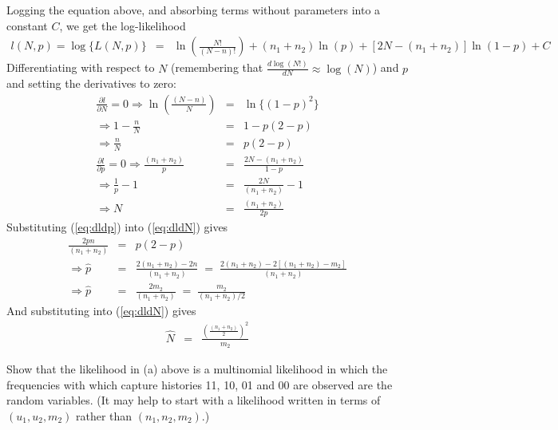 \begin{questions}
\begin{parts}
{\begin{solution}
Logging the equation above, and absorbing terms without parameters into a constant $C$, we get the log-likelihood
\begin{eqnarray*}
l(N,p)=\log\{L(N,p)\}&=&\ln\left(\frac{N!}{(N-n)!}\right)+(n_1+n_2)\ln(p)+[2N-(n_1+n_2)]\ln(1-p)+C
\end{eqnarray*}
\noindent
Differentiating with respect to $N$ (remembering that $\frac{d\log(N!)}{dN}\approx\log(N)$) and $p$ and setting the derivatives to zero:
\begin{eqnarray}
\frac{\partial l}{\partial N}=0\Rightarrow
\ln\left(\frac{(N-n)}{N}\right)
&=&\ln\{(1-p)^2\} \nonumber \\
\Rightarrow 1-\frac{n}{N}&=&1-p(2-p) \nonumber \\
\Rightarrow \frac{n}{N}&=&p(2-p) \label{eq:dldN} \\
\frac{\partial l}{\partial p}=0\Rightarrow
\frac{(n_1+n_2)}{p}&=&\frac{2N-(n_1+n_2)}{1-p} \nonumber \\
\Rightarrow\frac{1}{p}-1&=&\frac{2N}{(n_1+n_2)}-1 \nonumber \\
\Rightarrow N&=&\frac{(n_1+n_2)}{2p}\label{eq:dldp}
\end{eqnarray}
Substituting (\ref{eq:dldp}) into (\ref{eq:dldN}) gives
\begin{eqnarray}
\frac{2pn}{(n_1+n_2)}&=&p(2-p) \nonumber \\
\Rightarrow\hat{p}&=&\frac{2(n_1+n_2)-2n}{(n_1+n_2)}\;=\;
\frac{2(n_1+n_2)-2[(n_1+n_2)-m_2]}{(n_1+n_2)} \nonumber \\
\Rightarrow\hat{p}&=&\frac{2m_2}{(n_1+n_2)}\;=\;\frac{m_2}{(n_1+n_2)/2}
\end{eqnarray}
And substituting into (\ref{eq:dldN}) gives 
\begin{eqnarray}
\hat{N}&=&\frac{\left(\frac{(n_1+n_2)}{2}\right)^2}{m_2}
\end{eqnarray}

\end{solution}}



\item Show that the likelihood in (a) above is a multinomial likelihood in which the frequencies with which capture histories 11, 10, 01 and 00 are observed are the random variables. (It may help to start with a likelihood written in terms of $(u_1, u_2, m_2)$ rather than $(n_1, n_2, m_2)$.)


\end{parts}
\end{questions}
